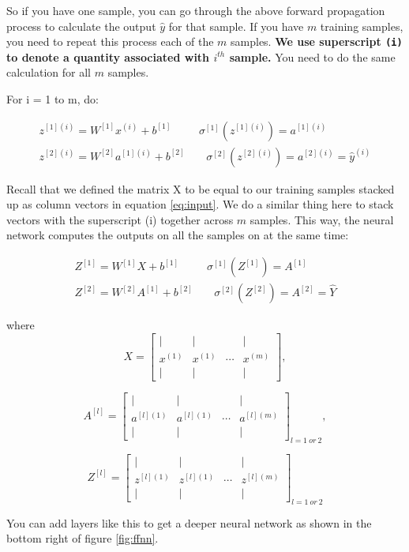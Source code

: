 \documentclass[12pt,]{krantz}
\begin{document}
So if you have one sample, you can go through the above forward propagation process to calculate the output \(\hat{y}\) for that sample. If you have \(m\) training samples, you need to repeat this process each of the \(m\) samples. \textbf{We use superscript \texttt{(i)} to denote a quantity associated with \(i^{th}\) sample.} You need to do the same calculation for all \(m\) samples.

For i = 1 to m, do:

\[\begin{array}{cc}
z^{[1](i)}=W^{[1]}x^{(i)}+b^{[1]} & \ \ \sigma^{[1]}(z^{[1](i)})=a^{[1](i)}\\
z^{[2](i)}=W^{[2]}a^{[1](i)}+b^{[2]} & \ \ \ \ \ \sigma^{[2]}(z^{[2](i)})=a^{[2](i)}=\hat{y}^{(i)}
\end{array}\]

Recall that we defined the matrix X to be equal to our training samples stacked up as column vectors in equation \eqref{eq:input}. We do a similar thing here to stack vectors with the superscript (i) together across \(m\) samples. This way, the neural network computes the outputs on all the samples on at the same time:

\[\begin{array}{cc}
Z^{[1]}=W^{[1]}X+b^{[1]} & \ \ \sigma^{[1]}(Z^{[1]})=A^{[1]}\\
Z^{[2]}=W^{[2]}A^{[1]}+b^{[2]} & \ \ \ \ \ \sigma^{[2]}(Z^{[2]})=A^{[2]}=\hat{Y}
\end{array}\]

where
\[X=\left[\begin{array}{cccc}
| & | &  & |\\
x^{(1)} & x^{(1)} & \cdots & x^{(m)}\\
| & | &  & |
\end{array}\right],\]

\[A^{[l]}=\left[\begin{array}{cccc}
| & | &  & |\\
a^{[l](1)} & a^{[l](1)} & \cdots & a^{[l](m)}\\
| & | &  & |
\end{array}\right]_{l=1\ or\ 2},\]

\[Z^{[l]}=\left[\begin{array}{cccc}
| & | &  & |\\
z^{[l](1)} & z^{[l](1)} & \cdots & z^{[l](m)}\\
| & | &  & |
\end{array}\right]_{l=1\ or\ 2}\]

You can add layers like this to get a deeper neural network as shown in the bottom right of figure \ref{fig:ffnn}.
\end{document}
